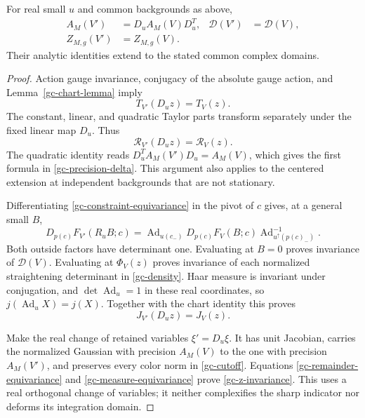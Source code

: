 \begin{proposition}
\label{gc-integral-proposition}
For real small $u$ and common backgrounds as above,
\begin{align}
 A_M(V')&=D_u A_M(V)D_u^T,&
 \mathcal D(V')&=\mathcal D(V),                           \label{gc-precision-delta}\\
 Z_{M,g}(V')&=Z_{M,g}(V).                                \label{gc-z-invariance}
\end{align}
Their analytic identities extend to the stated common complex domains.
\end{proposition}
\begin{proof}
Action gauge invariance, conjugacy of the absolute gauge action,
and Lemma~\ref{gc-chart-lemma} imply
\begin{equation}\label{gc-scalar-action-equivariance}
 T_{V'}(D_uz)=T_V(z).
\end{equation}
The constant, linear, and quadratic Taylor parts transform
separately under the fixed linear map $D_u$. Thus
\begin{equation}\label{gc-remainder-equivariance}
 \mathcal R_{V'}(D_uz)=\mathcal R_V(z).
\end{equation}
The quadratic identity reads $D_u^T A_M(V')D_u=A_M(V)$,
which gives the first formula in \eqref{gc-precision-delta}.
This argument also applies to the centered extension at independent
backgrounds that are not stationary.

Differentiating \eqref{gc-constraint-equivariance} in the pivot of
$c$ gives, at a general small $B$,
\begin{equation}\label{gc-pivot-equivariance}
 D_{p(c)}F_{V'}(R_uB;c)=
 \operatorname{Ad}_{u(c_-)}
 D_{p(c)}F_V(B;c)
 \operatorname{Ad}_{u^\uparrow(p(c)_-)}^{-1}.
\end{equation}
Both outside factors have determinant one. Evaluating at $B=0$
proves invariance of $\mathcal D(V)$. Evaluating at $\Phi_V(z)$
proves invariance of each normalized straightening determinant
in \eqref{gc-density}. Haar measure is invariant under conjugation,
and $\det\operatorname{Ad}_u=1$ in these real coordinates, so
$j(\operatorname{Ad}_uX)=j(X)$. Together with the chart identity
this proves
\begin{equation}\label{gc-measure-equivariance}
 J_{V'}(D_uz)=J_V(z).
\end{equation}

Make the real change of retained variables $\xi'=D_u\xi$.
It has unit Jacobian, carries the normalized Gaussian with
precision $A_M(V)$ to the one with precision $A_M(V')$, and
preserves every color norm in \eqref{gc-cutoff}. Equations
\eqref{gc-remainder-equivariance} and
\eqref{gc-measure-equivariance} prove \eqref{gc-z-invariance}.
This uses a real orthogonal change of variables; it neither
complexifies the sharp indicator nor deforms its integration domain.


\end{proof}
